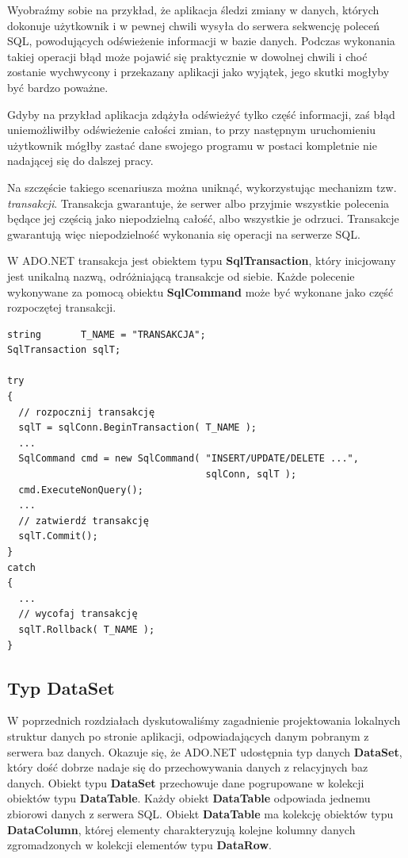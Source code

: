 Wyobraźmy sobie na przykład, że aplikacja śledzi zmiany w danych,
których dokonuje użytkownik i w pewnej chwili wysyła do serwera sekwencję poleceń SQL, powodujących
odświeżenie informacji w bazie danych. Podczas wykonania takiej operacji błąd może pojawić się praktycznie
w dowolnej chwili i choć zostanie wychwycony i przekazany aplikacji jako wyjątek, jego skutki mogłyby być
bardzo poważne.

Gdyby na przykład aplikacja zdążyła odświeżyć tylko część informacji, zaś błąd uniemożliwiłby odświeżenie
całości zmian, to przy następnym uruchomieniu użytkownik mógłby zastać dane swojego programu w postaci
kompletnie nie nadającej się do dalszej pracy.

Na szczęście takiego scenariusza można uniknąć, wykorzystując mechanizm tzw. {\em transakcji}.
Transakcja gwarantuje, że serwer albo przyjmie wszystkie polecenia będące jej częścią jako 
niepodzielną całość, albo wszystkie je odrzuci. Transakcje gwarantują więc niepodzielność wykonania się
operacji na serwerze SQL.

W ADO.NET transakcja jest obiektem typu {\bf SqlTransaction}, 
który inicjowany jest unikalną nazwą, odróżniającą transakcje od siebie.
Każde polecenie wykonywane za pomocą obiektu {\bf SqlCommand} może być wykonane
jako część rozpoczętej transakcji.

\begin{scriptsize}
\begin{verbatim}
string       T_NAME = "TRANSAKCJA";
SqlTransaction sqlT;

try
{
  // rozpocznij transakcję
  sqlT = sqlConn.BeginTransaction( T_NAME );
  ...
  SqlCommand cmd = new SqlCommand( "INSERT/UPDATE/DELETE ...", 
                                   sqlConn, sqlT );
  cmd.ExecuteNonQuery();
  ...
  // zatwierdź transakcję 
  sqlT.Commit();
}
catch
{
  ...
  // wycofaj transakcję 
  sqlT.Rollback( T_NAME );
}
\end{verbatim}
\end{scriptsize}

\subsection{Typ {\bf DataSet}}

W poprzednich rozdziałach dyskutowaliśmy zagadnienie projektowania lokalnych struktur danych po stronie
aplikacji, odpowiadających danym pobranym z serwera baz danych. Okazuje się, że ADO.NET udostępnia
typ danych {\bf DataSet}, który dość dobrze nadaje się do przechowywania danych z relacyjnych baz danych.
Obiekt typu {\bf DataSet} przechowuje dane pogrupowane w kolekcji obiektów typu {\bf DataTable}.
Każdy obiekt {\bf DataTable} odpowiada jednemu zbiorowi danych z serwera SQL. Obiekt {\bf DataTable} 
ma kolekcję obiektów typu {\bf DataColumn}, której elementy charakteryzują kolejne kolumny 
danych zgromadzonych w kolekcji elementów typu {\bf DataRow}.

